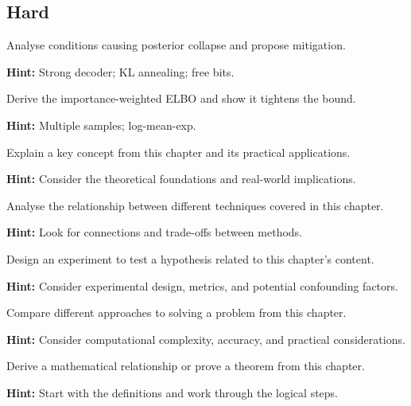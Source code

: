 \subsection*{Hard}

\begin{problem}
Analyse conditions causing posterior collapse and propose mitigation.

\textbf{Hint:} Strong decoder; KL annealing; free bits.
\end{problem}

\begin{problem}
Derive the importance-weighted ELBO and show it tightens the bound.

\textbf{Hint:} Multiple samples; log-mean-exp.
\end{problem}


\begin{problem}
Explain a key concept from this chapter and its practical applications.

\textbf{Hint:} Consider the theoretical foundations and real-world implications.
\end{problem}

\begin{problem}
Analyse the relationship between different techniques covered in this chapter.

\textbf{Hint:} Look for connections and trade-offs between methods.
\end{problem}

\begin{problem}
Design an experiment to test a hypothesis related to this chapter's content.

\textbf{Hint:} Consider experimental design, metrics, and potential confounding factors.
\end{problem}

\begin{problem}
Compare different approaches to solving a problem from this chapter.

\textbf{Hint:} Consider computational complexity, accuracy, and practical considerations.
\end{problem}

\begin{problem}
Derive a mathematical relationship or prove a theorem from this chapter.

\textbf{Hint:} Start with the definitions and work through the logical steps.
\end{problem}


